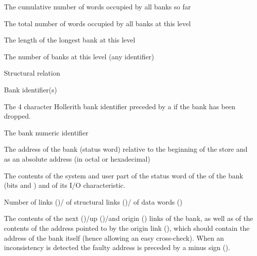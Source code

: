 \newpage

{\samepage \clearpage \begin{UL}\item The cumulative number of words occupied by all banks so far
\item The total number of words occupied by all banks at this level
\item The length of the longest bank at this level
\item The number of banks at this level (any identifier)
\item Structural relation
\item Bank identifier(s)
\end{UL}
}


\newpage

{\samepage \clearpage \begin{OLc}\item The 4 character Hollerith bank identifier preceded by a \Lit{(}
if the bank has been dropped.
\item The bank numeric identifier
\item The address of the bank (status word) relative to the beginning of
the store and as an absolute address (in octal or hexadecimal)
\item The contents of the system and user part of the status word of the
of the bank (bits  and ) and of its I/O characteristic.
\item Number of links ()/ of structural links
()/ of data words ()
\item The contents of the next ()/up ()/and origin ()
links of the bank,
as well as of the contents of the address pointed to by the origin link
(), which should contain
the address of the bank itself (hence allowing an easy cross-check).
When an inconsistency is detected the
faulty address is preceded by a minus sign (\Lit{-}).
\end{OLc}
}


\newpage


